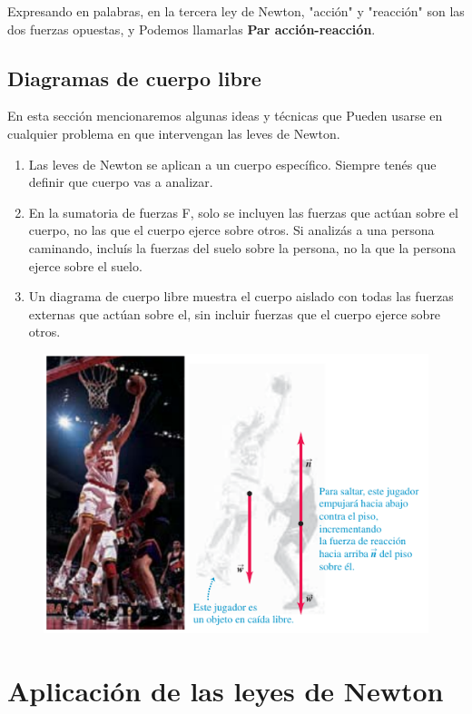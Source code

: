 \documentclass{article}
\newcommand{\newsection}[1]{
    \pagebreak
    {\color{sectionColor}
    \centering
    \section{\bl{#1}}}
    \color{black}
    \vspace{0.5cm}
}
\newcommand{\newsubsection}[1]{
    \vspace{0.5cm}
    \color{sectionColor}
    \subsection{\bl{#1}}
    \color{black}
    \vspace{0.5cm}
}
\newcommand{\bl}[1]{\textbf{#1}}
\begin{document}
    \par Expresando en palabras, en la tercera ley de Newton, "acción" y "reacción" son las dos fuerzas opuestas, y Podemos llamarlas \bl{Par acción-reacción}.

    \newsubsection{Diagramas de cuerpo libre}

    \par En esta sección mencionaremos algunas ideas y técnicas que Pueden usarse en cualquier problema en que intervengan las leves de Newton.

    \begin{enumerate}
        \item Las leves de Newton se aplican a un cuerpo específico. Siempre tenés que definir que cuerpo vas a analizar.
        \item En la sumatoria de fuerzas F, solo se incluyen las fuerzas que actúan sobre el cuerpo, no las que el cuerpo ejerce sobre otros. Si analizás a una persona caminando, incluís la fuerzas del suelo sobre la persona, no la que la persona ejerce sobre el suelo.
        \item Un diagrama de cuerpo libre muestra el cuerpo aislado con todas las fuerzas externas que actúan sobre el, sin incluir fuerzas que el cuerpo ejerce sobre otros.
    \end{enumerate}

    \begin{figure}[H]
        \centering
        \includegraphics[scale=0.7]{img/2.6-1.png}
    \end{figure}

\newsection{Aplicación de las leyes de Newton}
\end{document}
